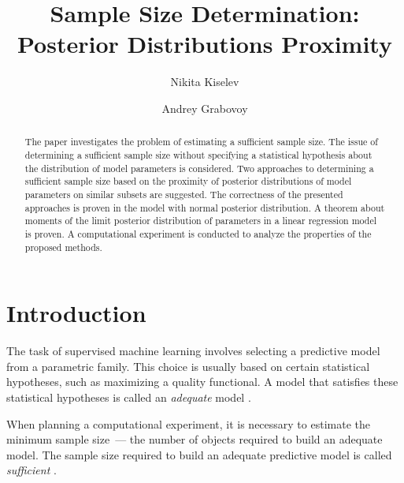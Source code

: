 \documentclass[runningheads]{llncs}
\begin{document}
%
\title{Sample Size Determination:\\Posterior Distributions Proximity}
%
%
\author{Nikita Kiselev \and Andrey Grabovoy}
%
%
%
\maketitle %
%
\begin{abstract}
The paper investigates the problem of estimating a sufficient sample size. The issue of determining a sufficient sample size without specifying a statistical hypothesis about the distribution of model parameters is considered. Two approaches to determining a sufficient sample size based on the proximity of posterior distributions of model parameters on similar subsets are suggested. The correctness of the presented approaches is proven in the model with normal posterior distribution. A theorem about moments of the limit posterior distribution of parameters in a linear regression model is proven. A computational experiment is conducted to analyze the properties of the proposed methods.

\end{abstract}
%
%
%
\section{Introduction}
The task of supervised machine learning involves selecting a predictive model from a parametric family. This choice is usually based on certain statistical hypotheses, such as maximizing a quality functional. A model that satisfies these statistical hypotheses is called an \textit{adequate} model \cite{bies2006genetic,cawley2010over,raschka2018model}.

When planning a computational experiment, it is necessary to estimate the minimum sample size~--- the number of objects required to build an adequate model. The sample size required to build an adequate predictive model is called \textit{sufficient} \cite{byrd2012sample,figueroa2012predicting,balki2019sample}. 
\end{document}
